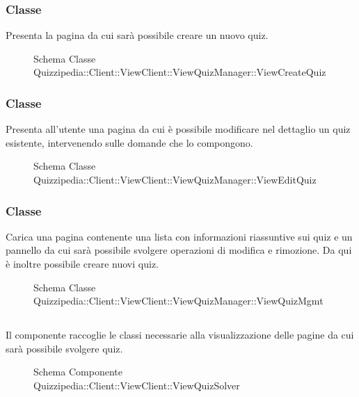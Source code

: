 \subsubsection{Classe }
Presenta la pagina da cui sarà possibile creare un nuovo quiz.
\begin{figure}[H]
\centering
\noindent{}
\caption[Schema Classe ViewCreateQuiz]{Schema Classe Quizzipedia::Client::ViewClient::ViewQuizManager::ViewCreateQuiz}
\end{figure}
\subsubsection{Classe }
Presenta all'utente una pagina da cui è possibile modificare nel dettaglio un quiz esistente, intervenendo sulle domande che lo compongono.
\begin{figure}[H]
\centering
\noindent{}
\caption[Schema Classe ViewEditQuiz]{Schema Classe Quizzipedia::Client::ViewClient::ViewQuizManager::ViewEditQuiz}
\end{figure}
\subsubsection{Classe }
Carica una pagina contenente una lista con informazioni riassuntive sui quiz e un pannello da cui sarà possibile svolgere operazioni di modifica e rimozione. Da qui è inoltre possibile creare nuovi quiz.
\begin{figure}[H]
\centering
\noindent{}
\caption[Schema Classe ViewQuizMgmt]{Schema Classe Quizzipedia::Client::ViewClient::ViewQuizManager::ViewQuizMgmt}
\end{figure}
\subsection{}
Il componente raccoglie le classi necessarie alla visualizzazione delle pagine da cui sarà possibile svolgere quiz.
\begin{figure}[H]
\centering
\noindent{}
\caption[Schema Componente Quizzipedia::Client::ViewClient::ViewQuizSolver]{Schema Componente Quizzipedia::Client::ViewClient::ViewQuizSolver}
\end{figure}

